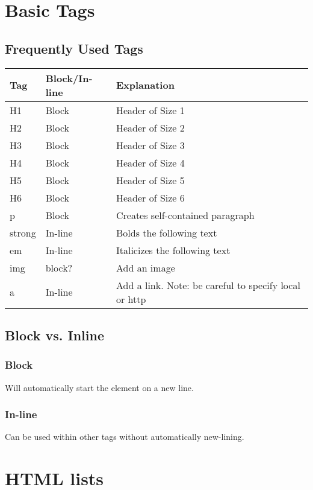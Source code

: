 \documentclass{article}
\begin{document}
\section{Basic Tags}
\subsection{Frequently Used Tags}
\begin{center}
	\begin{tabular}{| l | l | p{10cm} |}
		\hline
		\textbf{Tag} & \textbf{Block/In-line} & \textbf{Explanation} \\ \hline
		H1 & Block & Header of Size 1 \\ \hline
		H2 & Block & Header of Size 2 \\ \hline
		H3 & Block & Header of Size 3 \\ \hline
		H4 & Block & Header of Size 4 \\ \hline
		H5 & Block & Header of Size 5 \\ \hline
		H6 & Block & Header of Size 6 \\ \hline
		p & Block & Creates self-contained paragraph \\ \hline
		strong & In-line & Bolds the following text \\ \hline
		em & In-line & Italicizes the following text \\ \hline
		img & block? & Add an image \\ \hline
		a & In-line & Add a link. Note: be careful to specify local or http \\ \hline
	\end{tabular}
\end{center}

\subsection{Block vs. Inline}
\subsubsection{Block}
Will automatically start the element on a new line.
\subsubsection{In-line}
Can be used within other tags without automatically new-lining.

\section{HTML lists}
\end{document}
